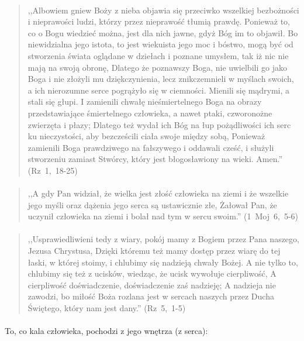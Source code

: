 \documentclass[10pt,a4paper,oneside]{article}
\begin{document}
\paragraph{}
\begin{quote}
,,Albowiem gniew Boży z nieba objawia się przeciwko wszelkiej bezbożności i nieprawości ludzi, którzy przez nieprawość tłumią prawdę. Ponieważ to, co o Bogu wiedzieć można, jest dla nich jawne, gdyż Bóg im to objawił. Bo niewidzialna jego istota, to jest wiekuista jego moc i bóstwo, mogą być od stworzenia świata oglądane w dziełach i poznane umysłem, tak iż nic nie mają na swoją obronę, Dlatego że poznawszy Boga, nie uwielbili go jako Boga i nie złożyli mu dziękczynienia, lecz znikczemnieli w myślach swoich, a ich nierozumne serce pogrążyło się w ciemności. Mienili się mądrymi, a stali się głupi. I zamienili chwałę nieśmiertelnego Boga na obrazy przedstawiające śmiertelnego człowieka, a nawet ptaki, czworonożne zwierzęta i płazy; Dlatego też wydał ich Bóg na łup pożądliwości ich serc ku nieczystości, aby bezcześcili ciała swoje między sobą, Ponieważ zamienili Boga prawdziwego na fałszywego i oddawali cześć, i służyli stworzeniu zamiast Stwórcy, który jest błogosławiony na wieki. Amen.'' \mbox{(Rz 1, 18-25)}
\end{quote}
\paragraph{}
\begin{quote}
,,A gdy Pan widział, że wielka jest złość człowieka na ziemi i że wszelkie jego myśli oraz dążenia jego serca są ustawicznie złe, Żałował Pan, że uczynił człowieka na ziemi i bolał nad tym w sercu swoim.'' \mbox{(1 Moj 6, 5-6)}
\end{quote}
\paragraph{}
\begin{quote}
,,Usprawiedliwieni tedy z wiary, pokój mamy z Bogiem przez Pana naszego, Jezusa Chrystusa, Dzięki któremu też mamy dostęp przez wiarę do tej łaski, w której stoimy, i chlubimy się nadzieją chwały Bożej. A nie tylko to, chlubimy się też z ucisków, wiedząc, że ucisk wywołuje cierpliwość, A cierpliwość doświadczenie, doświadczenie zaś nadzieję; A nadzieja nie zawodzi, bo miłość Boża rozlana jest w sercach naszych przez Ducha Świętego, który nam jest dany.'' \mbox{(Rz 5, 1-5)}
\end{quote}
\paragraph{}
To, co kala człowieka, pochodzi z jego wnętrza (z serca):
\end{document}
